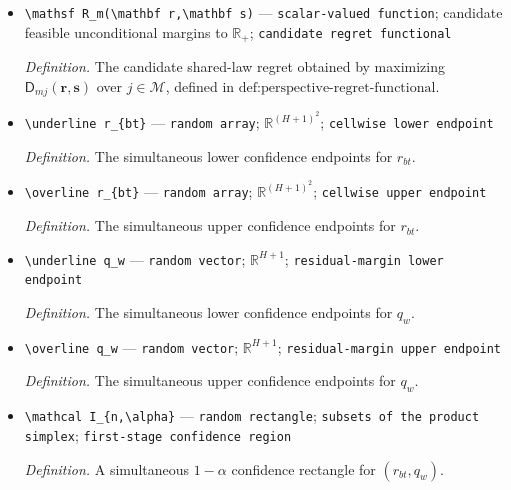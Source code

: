 \documentclass{article}
\begin{document}
\begin{itemize}
  \par\smallskip\noindent\emph{Definition.} The signed worst-case difference between candidate threshold losses \(m\) and \(j\), defined in \(\text{def:perspective-regret-functional}\).
  \item \texttt{\textbackslash{}\allowbreak{}mathsf R\_\allowbreak{}m(\textbackslash{}\allowbreak{}mathbf r,\allowbreak{}\textbackslash{}\allowbreak{}mathbf s)} --- \texttt{scalar-\allowbreak{}valued function}; candidate feasible unconditional margins to \(\mathbb R_+\); \texttt{candidate regret functional}
  \par\smallskip\noindent\emph{Definition.} The candidate shared-law regret obtained by maximizing \(\mathsf D_{mj}(\mathbf r,\mathbf s)\) over \(j\in\mathcal M\), defined in \(\text{def:perspective-regret-functional}\).
  \item \texttt{\textbackslash{}\allowbreak{}underline r\_\allowbreak{}\{bt\}\allowbreak{}} --- \texttt{random array}; \(\mathbb R^{(H+1)^2}\); \texttt{cellwise lower endpoint}
  \par\smallskip\noindent\emph{Definition.} The simultaneous lower confidence endpoints for \(r_{bt}\).
  \item \texttt{\textbackslash{}\allowbreak{}overline r\_\allowbreak{}\{bt\}\allowbreak{}} --- \texttt{random array}; \(\mathbb R^{(H+1)^2}\); \texttt{cellwise upper endpoint}
  \par\smallskip\noindent\emph{Definition.} The simultaneous upper confidence endpoints for \(r_{bt}\).
  \item \texttt{\textbackslash{}\allowbreak{}underline q\_\allowbreak{}w} --- \texttt{random vector}; \(\mathbb R^{H+1}\); \texttt{residual-\allowbreak{}margin lower endpoint}
  \par\smallskip\noindent\emph{Definition.} The simultaneous lower confidence endpoints for \(q_w\).
  \item \texttt{\textbackslash{}\allowbreak{}overline q\_\allowbreak{}w} --- \texttt{random vector}; \(\mathbb R^{H+1}\); \texttt{residual-\allowbreak{}margin upper endpoint}
  \par\smallskip\noindent\emph{Definition.} The simultaneous upper confidence endpoints for \(q_w\).
  \item \texttt{\textbackslash{}\allowbreak{}mathcal I\_\allowbreak{}\{n,\allowbreak{}\textbackslash{}\allowbreak{}alpha\}\allowbreak{}} --- \texttt{random rectangle}; \texttt{subsets of the product simplex}; \texttt{first-\allowbreak{}stage confidence region}
  \par\smallskip\noindent\emph{Definition.} A simultaneous \(1-\alpha\) confidence rectangle for \((r_{bt},q_w)\).

\end{itemize}
\end{document}

